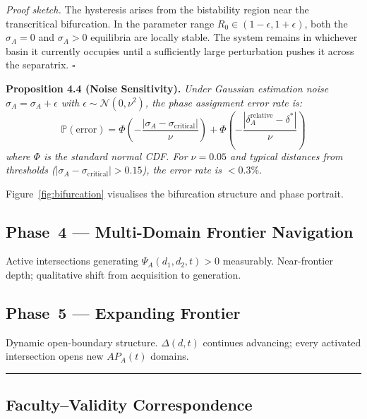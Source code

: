 \textit{Proof sketch.} The hysteresis arises from the bistability region
near the transcritical bifurcation. In the parameter range
$R_0 \in (1 - \epsilon, 1 + \epsilon)$, both the $\sigma_A = 0$ and
$\sigma_A > 0$ equilibria are locally stable. The system remains in
whichever basin it currently occupies until a sufficiently large
perturbation pushes it across the separatrix. $\square$

\textbf{Proposition 4.4 (Noise Sensitivity).} %
\textit{Under Gaussian estimation noise $\hat{\sigma}_A = \sigma_A + \epsilon$
with $\epsilon \sim \mathcal{N}(0, \nu^2)$, the phase assignment error rate is:
\begin{equation}\label{eq:phase-error-rate}
\mathbb{P}(\text{error}) = \Phi\!\left(-\frac{|\sigma_A - \sigma_{\text{critical}}|}{\nu}\right) + \Phi\!\left(-\frac{|\delta_A^{\text{relative}} - \delta^*|}{\nu}\right)
\end{equation}
where $\Phi$ is the standard normal CDF. For $\nu = 0.05$ and typical
distances from thresholds ($|\sigma_A - \sigma_{\text{critical}}| > 0.15$),
the error rate is $< 0.3\%$.}



Figure~\ref{fig:bifurcation} visualises the bifurcation structure and phase portrait.

\subsection*{Phase~4 --- Multi-Domain Frontier Navigation}

Active intersections generating $\Psi_A(d_1,d_2,t) > 0$ measurably.
Near-frontier depth; qualitative shift from acquisition to generation.

\subsection*{Phase~5 --- Expanding Frontier}

Dynamic open-boundary structure. $\Delta(d,t)$ continues advancing;
every activated intersection opens new $AP_A(t)$ domains.

\noindent\rule{\linewidth}{0.4pt}

\subsection{Faculty--Validity Correspondence}\label{sec:faculty-validity}


